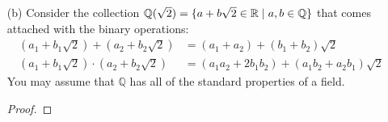 \documentclass[12pt]{article}
\newcommand      {\Zm}         {{\mathbb Z}}
\begin{document}
\begin{itemize}
\begin{itemize}
    \begin{proof}
        We know from class that for any integer $n$, $\Zm/n\Zm$ will be a commutative ring. All we need to show now is that, when $n$ is prime, every non-zero element in it will have multiplicative inverses. 

        By definition a prime number, $p$, will share no common divisors except 1 with another integer $n$ ($n\neq p$). Thus take any non-zero element $n \in \Zm/p\Zm$. $n$ represents a congruence class of elements which are by definition not multiples of $p$. Thus, gcd$(n,p) = 1$. 

        From here we know from elementary number theory that there exists $u,v\in\Zm$ such that \[u\cdot n + v\cdot p = 1.\] Bringing this into $\Zm/p\Zm$ we have
        \begin{align*}
            \overline{u}\cdot \overline{n} + \overline{0} \equiv \overline{1} \\
            \overline{u}\cdot \overline{n} \equiv \overline{1}
        \end{align*}

        That means for any non-zero $n\in \Zm/p\Zm$, where $p$ is prime, that there exists a $u\in \Zm/p\Zm$ such that $\overline{u}\cdot \overline{n}= 1 $. Which means that every non-zero element has a multiplicative inverse. Thus satisfying the criteria to be a field.
    \end{proof}
    
    \vspace{.3cm}
    \item[(b)]
    Consider the collection $\mathbb{Q}(\sqrt{2}) = \{a + b\sqrt{2} \in \mathbb{R} \hspace{.1cm} | \hspace{.1cm} a,b \in \mathbb{Q}\}$ that comes attached with the binary operations:
    \begin{equation*}
    \begin{split}
    (a_1 + b_1\sqrt{2}) + (a_2 + b_2\sqrt{2}) &= (a_1 + a_2) + (b_1 + b_2)\sqrt{2} \\
    (a_1 + b_1\sqrt{2}) \cdot (a_2 + b_2\sqrt{2}) &= (a_1a_2 + 2b_1b_2) + (a_1b_2 + a_2b_1)\sqrt{2}
    \end{split}
    \end{equation*}
    You may assume that $\mathbb{Q}$ has all of the standard properties of a field. 

    \begin{proof} 


\end{proof}
\end{itemize}
\end{itemize}
\end{document}
